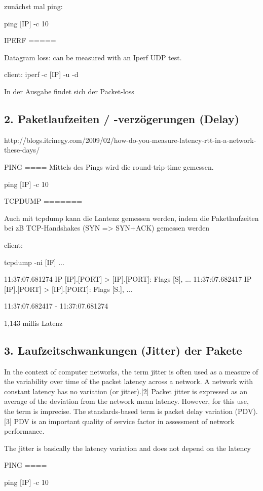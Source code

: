 \documentclass[a4paper,10pt]{article}
\begin{document}
zunächst mal ping:

ping [IP] -c 10

IPERF
=====

Datagram loss: can be measured with an Iperf UDP test.

client: iperf -c [IP] -u -d

In der Ausgabe findet sich der Packet-loss

\subsection{2. Paketlaufzeiten / -verzögerungen (Delay)}

http://blogs.itrinegy.com/2009/02/how-do-you-measure-latency-rtt-in-a-network-these-days/

PING
====
Mittels des Pings wird die round-trip-time gemessen.


ping [IP] -c 10

TCPDUMP
=======

Auch mit tcpdump kann die Lantenz gemessen werden, indem die Paketlaufzeiten bei zB TCP-Handshakes (SYN => SYN+ACK) gemessen werden

client:

tcpdump -ni [IF]
...

11:37:07.681274 IP [IP].[PORT] > [IP].[PORT]: Flags [S], ...
11:37:07.682417 IP [IP].[PORT] > [IP].[PORT]: Flags [S.], ...

11:37:07.682417 - 11:37:07.681274

1,143 millis Latenz

\subsection{3. Laufzeitschwankungen (Jitter) der Pakete}

In the context of computer networks, the term jitter is often used as a measure of the variability over time of the packet latency across a network. A network with constant latency has no variation (or jitter).[2] Packet jitter is expressed as an average of the deviation from the network mean latency. However, for this use, the term is imprecise. The standards-based term is packet delay variation (PDV).[3] PDV is an important quality of service factor in assessment of network performance.

The jitter is basically the latency variation and does not depend on the latency

PING
====

ping [IP] -c 10
\end{document}
